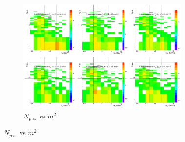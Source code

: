 \begin{figure}[H]
  \centering
    \begin{subfigure}{1\textwidth}
   \centering
   \includegraphics[width=0.94\textwidth]{hiptfits/neg/PSaccthreshold_cent0_ich0_accfire0_ptbin14.jpg}
    \caption{$N_{p.e.}$ vs $m^2$}
    \end{subfigure}
\end{figure}
